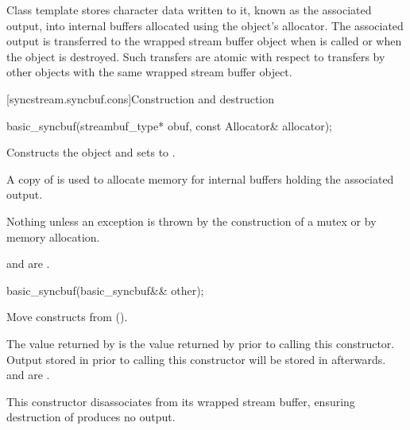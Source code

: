 \pnum
Class template  stores character data
written to it, known as the associated output, into internal
buffers allocated using the object's allocator.
The associated output is transferred to the
wrapped stream buffer object 
when  is called
or when the  object is destroyed.
Such transfers are atomic with respect to transfers
by other  objects
with the same wrapped stream buffer object.

[syncstream.syncbuf.cons]{Construction and destruction}

%
\begin{itemdecl}
basic_syncbuf(streambuf_type* obuf, const Allocator& allocator);
\end{itemdecl}

\begin{itemdescr}
\pnum
\effects
Constructs the  object and
sets  to .

\pnum
\remarks
A copy of  is used
to allocate memory for internal buffers
holding the associated output.

\pnum
\throws
Nothing unless an exception is thrown
by the construction of a mutex or
by memory allocation.

\pnum
\ensures
{} and
 are .
\end{itemdescr}

%
\begin{itemdecl}
basic_syncbuf(basic_syncbuf&& other);
\end{itemdecl}

\begin{itemdescr}
\pnum
\effects
Move constructs from  ().

\pnum
\ensures
The value returned by 
is the value returned by 
prior to calling this constructor.
Output stored in 
prior to calling this constructor
will be stored in  afterwards.
and
are .

\pnum
\remarks
This constructor disassociates 
from its wrapped stream buffer,
ensuring destruction of  produces no output.
\end{itemdescr}

